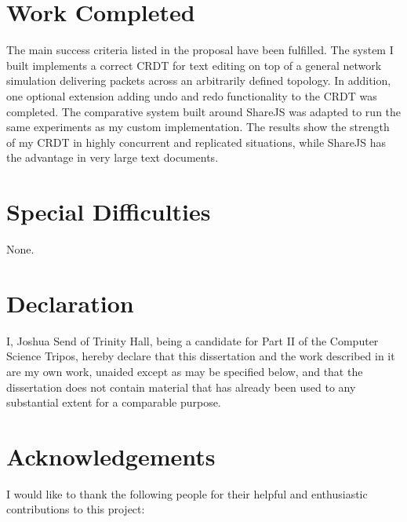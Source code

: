 \documentclass[12pt,a4paper,twoside,openright]{report}
\begin{document}
\section*{Work Completed}

The main success criteria listed in the proposal have been fulfilled. The system I built implements a correct CRDT for text editing on top of a general network simulation delivering packets across an arbitrarily defined topology. In addition, one optional extension adding undo and redo functionality to the CRDT was completed. The comparative system built around ShareJS was adapted to run the same experiments as my custom implementation. The results show the strength of my CRDT in highly concurrent and replicated situations, while ShareJS has the advantage in very large text documents.

\section*{Special Difficulties}

None.
 
\newpage
\section*{Declaration}

I, Joshua Send of Trinity Hall, being a candidate for Part II of the Computer
Science Tripos, hereby declare that this dissertation and the work described in it are my own work,
unaided except as may be specified below, and that the dissertation
does not contain material that has already been used to any substantial
extent for a comparable purpose.

\bigskip
{}

\medskip
{}

\tableofcontents

\listoffigures

\listoftables

\newpage
\section*{Acknowledgements}

I would like to thank the following people for their helpful and enthusiastic contributions to this project:
\end{document}
